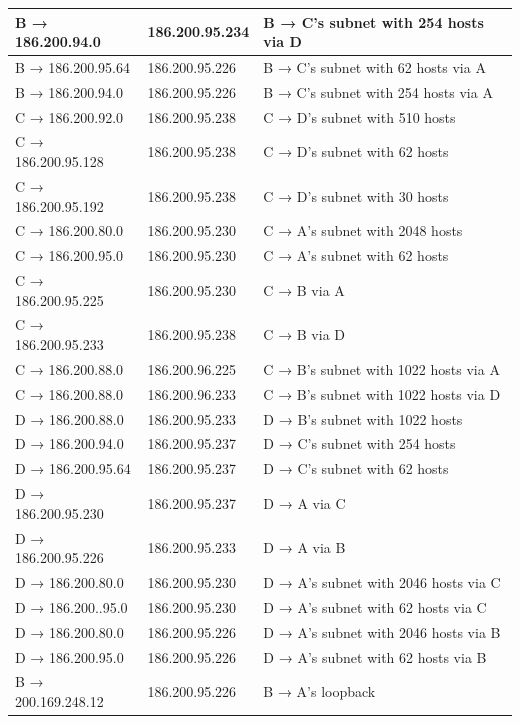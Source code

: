 \documentclass[a4paper, titlepage,12pt]{article}
\begin{document}
\begin{center}
\begin{longtable}{|l|l|l|}
			\hline
			B → 186.200.94.0 & 186.200.95.234 & B →  C’s subnet with 254 hosts via D \	\\
			\hline
			B → 186.200.95.64 & 186.200.95.226 & B →  C’s subnet with 62 hosts via A \\
			\hline
			B → 186.200.94.0 & 186.200.95.226 & B →  C’s subnet with 254 hosts via A \\
			\hline
			C → 186.200.92.0 & 186.200.95.238 & C →  D’s subnet with 510 hosts \\
			\hline
			C → 186.200.95.128 & 186.200.95.238 & C →  D’s subnet with 62 hosts \\
			\hline
			C → 186.200.95.192 & 186.200.95.238 & C →  D’s subnet with 30 hosts \\
			\hline
			C → 186.200.80.0 & 186.200.95.230 & C →  A’s subnet with 2048 hosts \\
			\hline
			C → 186.200.95.0 & 186.200.95.230 & C →  A’s subnet with 62 hosts \\
			\hline
			C → 186.200.95.225 & 186.200.95.230 & C →  B via A \\
			\hline
			C → 186.200.95.233 & 186.200.95.238 & C →  B via D \\
			\hline
			C → 186.200.88.0 & 186.200.96.225 & C →  B’s subnet with 1022 hosts via A \\
			\hline
			C → 186.200.88.0 & 186.200.96.233 & C →  B’s subnet with 1022 hosts via D \\
			\hline
			D → 186.200.88.0 & 186.200.95.233 & D →  B’s subnet with 1022 hosts \\
			\hline
			D → 186.200.94.0 & 186.200.95.237 & D →  C’s subnet with 254 hosts \\
			\hline
			D → 186.200.95.64 & 186.200.95.237 & D →  C’s subnet with 62 hosts \\
			\hline
			D → 186.200.95.230 & 186.200.95.237 & D →  A via C \\
			\hline
			D → 186.200.95.226 & 186.200.95.233 & D →  A via B \\
			\hline
			D → 186.200.80.0 & 186.200.95.230 & D →  A’s subnet with 2046 hosts via C \\
			\hline
			D → 186.200..95.0 & 186.200.95.230 & D →  A’s subnet with 62 hosts via C \\
			\hline
			D → 186.200.80.0 & 186.200.95.226 & D →  A’s subnet with 2046 hosts via B \\
			\hline
			D → 186.200.95.0 & 186.200.95.226 & D →  A’s subnet with 62 hosts via B \\
			\hline
			B → 200.169.248.12 & 186.200.95.226 & B →  A’s loopback  \\

\end{longtable}
\end{center}
\end{document}
